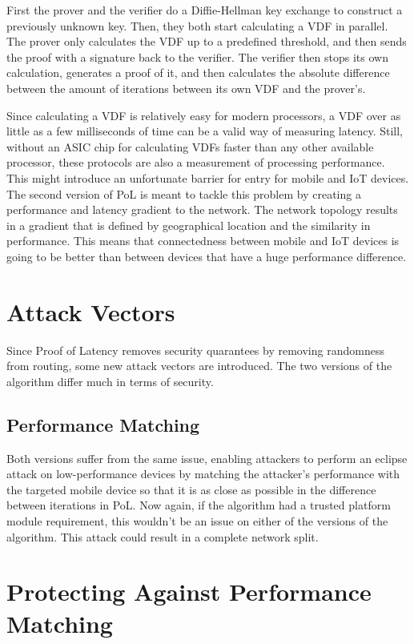 First the prover and the verifier do a Diffie-Hellman key exchange to construct a previously unknown key. Then, they both start calculating a VDF in parallel. The prover only calculates the VDF up to a predefined threshold, and then sends the proof with a signature back to the verifier. The verifier then stops its own calculation, generates a proof of it, and then calculates the absolute difference between the amount of iterations between its own VDF and the prover's.

Since calculating a VDF is relatively easy for modern processors, a VDF over as little as a few milliseconds of time can be a valid way of measuring latency. Still, without an ASIC chip for calculating VDFs faster than any other available processor, these protocols are also a measurement of processing performance. This might introduce an unfortunate barrier for entry for mobile and IoT devices. The second version of PoL is meant to tackle this problem by creating a performance and latency gradient to the network. The network topology results in a gradient that is defined by geographical location and the similarity in performance. This means that connectedness between mobile and IoT devices is going to be better than between devices that have a huge performance difference.

\section{Attack Vectors}
Since Proof of Latency removes security quarantees by removing randomness from routing, some new attack vectors are introduced. The two versions of the algorithm differ much in terms of security.

\subsection{Performance Matching}
Both versions suffer from the same issue, enabling attackers to perform an eclipse attack on low-performance devices by matching the attacker's performance with the targeted mobile device so that it is as close as possible in the difference between iterations in PoL. Now again, if the algorithm had a trusted platform module requirement, this wouldn't be an issue on either of the versions of the algorithm. This attack could result in a complete network split.

\section{Protecting Against Performance Matching}
